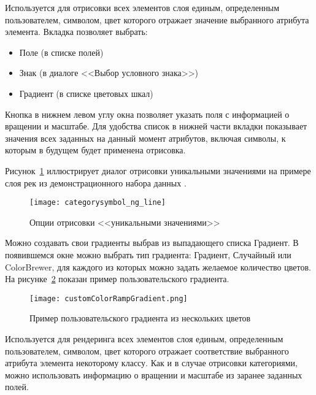 
Используется для отрисовки всех элементов слоя единым, определенным
пользователем, символом, цвет которого отражает значение выбранного
атрибута элемента. Вкладка  позволяет выбрать:

\begin{itemize}[label=--]
\item Поле (в списке полей)
\item Знак (в диалоге <<Выбор условного знака>>)
\item Градиент (в списке цветовых шкал)
\end{itemize}

Кнопка  в нижнем левом углу окна позволяет указать
поля с информацией о вращении и масштабе.
Для удобства список в нижней части вкладки показывает значения всех заданных
на данный момент атрибутов, включая символы, к которым в будущем
будет применена отрисовка.

Рисунок~\ref{fig:catsymNG} иллюстрирует диалог отрисовки уникальными значениями
на примере слоя рек из демонстрационного набора данных \qg.

\begin{figure}[ht]
   \centering
   \texttt{[image: categorysymbol\_ng\_line]}
   \caption{Опции отрисовки <<уникальными значениями>> \wincaption}\label{fig:catsymNG}
\end{figure}

Можно создавать свои градиенты выбрав  из
выпадающего списка Градиент. В появившемся окне можно выбрать тип градиента:
Градиент, Случайный или ColorBrewer, для каждого из которых можно задать
желаемое количество цветов. На рисунке~\ref{fig:ccrg} показан пример
пользовательского градиента.

\begin{figure}[ht]
   \centering
   \texttt{[image: customColorRampGradient.png]}
   \caption{Пример пользовательского градиента из нескольких цветов \wincaption}\label{fig:ccrg}
\end{figure}


Используется для рендеринга всех элементов слоя единым, определенным
пользователем, символом, цвет которого отражает соответствие
выбранного атрибута элемента некоторому классу. Как и в случае отрисовки
категориями, можно использовать информацию о вращении и масштабе из
заранее заданных полей.

